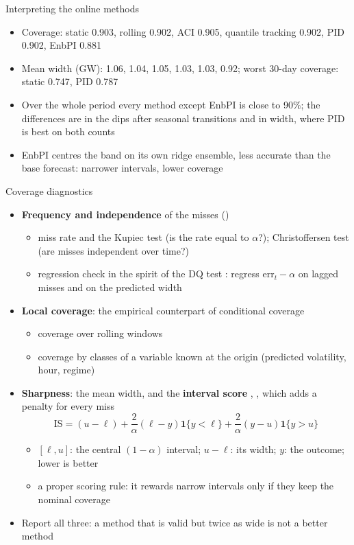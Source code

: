 \begin{frame}{Interpreting the online methods}
\itemsize{\small}
\begin{itemize}
    \item Coverage: static 0.903, rolling 0.902, ACI 0.905, quantile tracking 0.902, PID 0.902, EnbPI 0.881
    \item Mean width (GW): 1.06, 1.04, 1.05, 1.03, 1.03, 0.92; worst 30-day coverage: static 0.747, PID 0.787
    \item Over the whole period every method except EnbPI is close to 90\%; the differences are in the dips after seasonal transitions and in width, where PID is best on both counts
    \item EnbPI centres the band on its own ridge ensemble, less accurate than the base forecast: narrower intervals, lower coverage
\end{itemize}
\end{frame}

\begin{frame}{Coverage diagnostics}
\itemsize{\small}
\begin{itemize}
    \item \textbf{Frequency and independence} of the misses ()
    \begin{itemize}
        \item miss rate and the Kupiec test  (is the rate equal to $\alpha$?); Christoffersen test  (are misses independent over time?)
        \item regression check in the spirit of the DQ test : regress $\mathrm{err}_t - \alpha$ on lagged misses and on the predicted width
    \end{itemize}
    \item \textbf{Local coverage}: the empirical counterpart of conditional coverage
    \begin{itemize}
        \item coverage over rolling windows
        \item coverage by classes of a variable known at the origin (predicted volatility, hour, regime)
    \end{itemize}
    \item \textbf{Sharpness}: the mean width, and the \textbf{interval score} , , which adds a penalty for every miss \[ \mathrm{IS} = (u - \ell) + \frac{2}{\alpha}(\ell - y)\mathbf 1\{y < \ell\} + \frac{2}{\alpha}(y - u)\mathbf 1\{y > u\} \]
    \begin{itemize}
        \item $[\ell, u]$: the central $(1 - \alpha)$ interval; $u - \ell$: its width; $y$: the outcome; lower is better
        \item a proper scoring rule: it rewards narrow intervals only if they keep the nominal coverage
    \end{itemize}
    \item Report all three: a method that is valid but twice as wide is not a better method
\end{itemize}
\end{frame}

